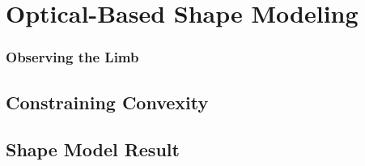 \chapter{Optical-Based Shape Modeling}
\label{shape_modeling}

\subsection{Observing the Limb}

\section{Constraining Convexity}

\section{Shape Model Result}

